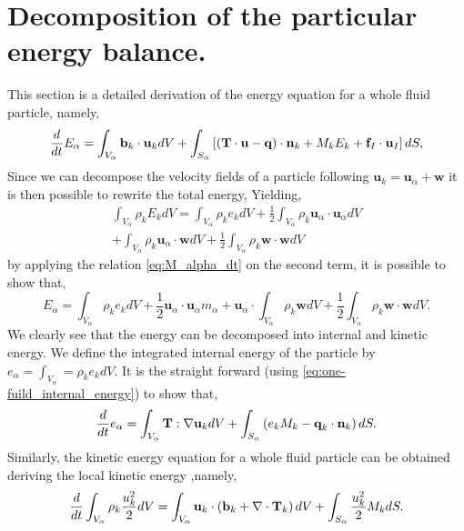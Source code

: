 \section{Decomposition of the particular energy balance.}
This section is a detailed derivation of the energy equation for a whole fluid particle, namely,
\begin{equation*}
    \label{ap:eq:E_alpha_dt}
    \frac{d}{d t} E_\alpha 
    = \int_{V_\alpha} \textbf{b}_k \cdot \textbf{u}_k dV
    + \int_{S_\alpha} \left[
        (\textbf{T}\cdot \textbf{u} 
    - \textbf{q})\cdot\textbf{n}_k 
    + M_k E_k 
    + \textbf{f}_I \cdot \textbf{u}_I 
    \right]dS, 
\end{equation*}
Since we can decompose the velocity fields of a particle following $\textbf{u}_k = \textbf{u}_\alpha + \textbf{w}$ it is then possible to rewrite the total energy, 
Yielding, 
\begin{multline*}
    \int_{V_\alpha} \rho_k E_k dV
    = \int_{V_\alpha} \rho_k e_k dV
    + \frac{1}{2} \int_{V_\alpha} \rho_k \textbf{u}_\alpha\cdot\textbf{u}_\alpha dV\\
    + \int_{V_\alpha} \rho_k \textbf{u}_\alpha\cdot\textbf{w} dV
    + \frac{1}{2} \int_{V_\alpha} \rho_k \textbf{w}\cdot\textbf{w} dV
\end{multline*}
by applying the relation \ref{eq:M_alpha_dt} on the second term, it is possible to show that,
\begin{equation*}
    E_\alpha
    = \int_{V_\alpha} \rho_k e_k dV
    + \frac{1}{2} \textbf{u}_\alpha\cdot\textbf{u}_\alpha  m_\alpha
    + \textbf{u}_\alpha\cdot \int_{V_\alpha} \rho_k \textbf{w} dV
    + \frac{1}{2} \int_{V_\alpha} \rho_k \textbf{w}\cdot\textbf{w} dV.
\end{equation*}
We clearly see that the energy can be decomposed into internal and kinetic energy. 
We define the integrated internal energy of the particle by $e_\alpha = \int_{V_\alpha} = \rho_k e_k dV$.
It is the straight forward (using \ref{eq:one-fuild_internal_energy}) to show that, 
\begin{equation*}
    \frac{d}{d t} e_\alpha
    = \int_{V_\alpha} \textbf{T}:\mathbf{\nabla}\textbf{u}_k dV
    + \int_{S_\alpha} \left(
        e_k M_k
        - \textbf{q}_k \cdot \textbf{n}_k
    \right) dS.
\end{equation*}
Similarly, the kinetic energy equation for a whole fluid particle can be obtained deriving the local kinetic energy ,namely,
\begin{equation*}
    \frac{d}{d t} \int_{V_\alpha} \rho_k \frac{u_k^2}{2} dV
    = \int_{V_\alpha}\textbf{u}_k \cdot  \left(
        \textbf{b}_k
        + \mathbf{\nabla} \cdot \textbf{T}_k
    \right)dV
    + \int_{S_\alpha} \frac{u_k^2}{2} M_k dS.
\end{equation*}
